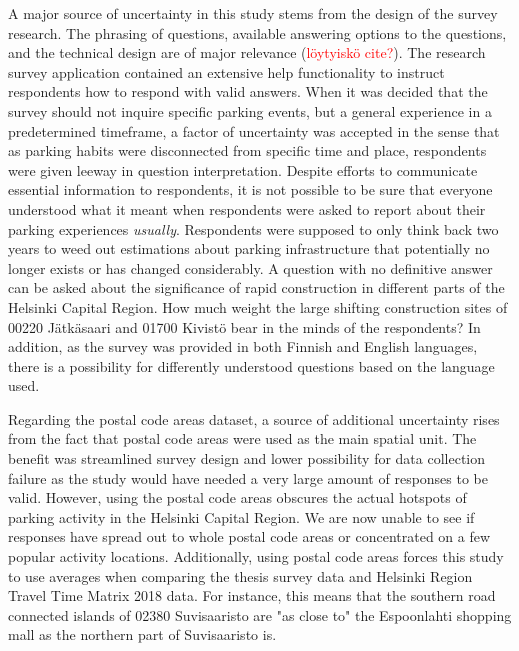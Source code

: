 A major source of uncertainty in this study stems from the design of the survey research. The phrasing of questions, available answering options to the questions, and the technical design are of major relevance (\textcolor{red}{löytyiskö cite?}). The research survey application contained an extensive help functionality to instruct respondents how to respond with valid answers. When it was decided that the survey should not inquire specific parking events, but a general experience in a predetermined timeframe, a factor of uncertainty was accepted in the sense that as parking habits were disconnected from specific time and place, respondents were given leeway in question interpretation. Despite efforts to communicate essential information to respondents, it is not possible to be sure that everyone understood what it meant when respondents were asked to report about their parking experiences \textit{usually}. Respondents were supposed to only think back two years to weed out estimations about parking infrastructure that potentially no longer exists or has changed considerably. A question with no definitive answer can be asked about the significance of rapid construction in different parts of the Helsinki Capital Region. How much weight the large shifting construction sites of 00220 Jätkäsaari and 01700 Kivistö bear in the minds of the respondents? In addition, as the survey was provided in both Finnish and English languages, there is a possibility for differently understood questions based on the language used.

Regarding the postal code areas dataset, a source of additional uncertainty rises from the fact that postal code areas were used as the main spatial unit. The benefit was streamlined survey design and lower possibility for data collection failure as the study would have needed a very large amount of responses to be valid. However, using the postal code areas obscures the actual hotspots of parking activity in the Helsinki Capital Region. We are now unable to see if responses have spread out to whole postal code areas or concentrated on a few popular activity locations. Additionally, using postal code areas forces this study to use averages when comparing the thesis survey data and Helsinki Region Travel Time Matrix 2018 data. For instance, this means that the southern road connected islands of 02380 Suvisaaristo are "as close to" the Espoonlahti shopping mall as the northern part of Suvisaaristo is.

